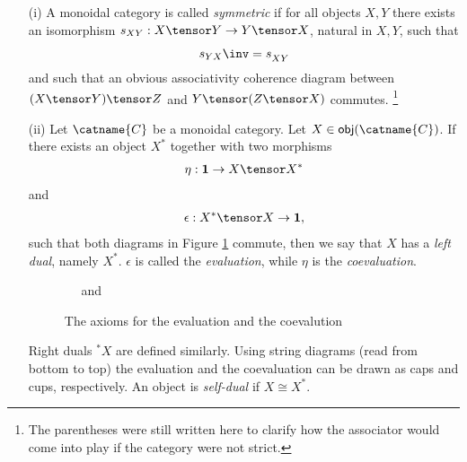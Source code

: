 \begin{definition}
\begin{itemize}
\item[\textsf{(i)}] A monoidal category is called \emph{symmetric} if for all objects $X,Y$ there exists an isomorphism $s_{XY}:X\tensor Y \rightarrow Y\tensor X$, natural in $X,Y$, such that
\[s_{YX}\inv = s_{XY}^{\phantom{-1}}\]
and such that an obvious associativity coherence diagram between $(X\tensor Y)\tensor Z$ and $Y\tensor (Z\tensor X)$ commutes. \footnote{The parentheses were still written here to clarify how the associator would come into play if the category were not strict.}
\item[\textsf{(ii)}] Let $\catname{C}$ be a monoidal category. Let $X\in\mathsf{obj}(\catname{C})$. If there exists an object $X^*$ together with two morphisms
\begin{align*}
\eta:\mathbf{1} \rightarrow X\tensor X^*
\end{align*}
and 
\begin{align*}
\epsilon:X^*\tensor X \rightarrow \mathbf{1},
\end{align*}
such that both diagrams in Figure \ref{fig:ev_coev_triangle} commute, then we say that $X$ has a \emph{left dual}, namely $X^*$. $\epsilon$ is called the \emph{evaluation}, while $\eta$ is the \emph{coevaluation}.
\begin{figure}[!htp]\centering
{}~~
and~~
\caption{The axioms for the evaluation and the coevalution}\label{fig:ev_coev_triangle}
\end{figure}

Right duals ${}^*X$ are defined similarly. Using string diagrams (read from bottom to top) the evaluation and the coevaluation can be drawn as caps and cups, respectively. An object is \emph{self-dual} if $X\cong X^*$.


\end{itemize}
\end{definition}
